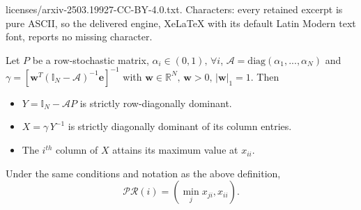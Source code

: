 \documentclass[10pt,a4paper]{amsart}
\newcommand{\I}{\mathbb{I}}
\newcommand{\be}{\mathbf{e}}
\newcommand{\bw}{\bm{w}}
\newcommand{\cA}{\mathcal{A}}
\begin{document}
licenses/arxiv-2503.19927-CC-BY-4.0.txt. Characters: every retained excerpt is pure ASCII, so the delivered engine, XeLaTeX with its default Latin Modern text font, reports no missing character.
\begin{lemma}\label{lem:diagonaldom-NPR}
	Let $P$ be a row-stochastic matrix, $\alpha_i\in(0,1),\,\forall i$, $\cA=\textrm{diag}(\alpha_1,...,\alpha_N)$ and $\gamma = [\bw^T(\I_N -\cA)^{-1}\be]^{-1}$ with $\bw\in \mathbb{R}^{N},\, \bw>0,\, |\bw|_1=1$. Then
	\begin{itemize}
		\item $Y=\I_N -\cA P$ is strictly row-diagonally dominant.
		\item $X=\gamma\, Y^{-1}$ is strictly diagonally dominant of its column entries.
		\item The $i^{th}$ column of $X$ attains its maximum value at $x_{ii}$.
	\end{itemize}
\end{lemma}

\begin{theorem}
	Under the same conditions and notation as the above definition,
	\begin{equation}
		\mathcal{P R}(i) = (\min_j x_{ji}, x_{ii}).
	\end{equation}
\end{theorem}
\end{document}
